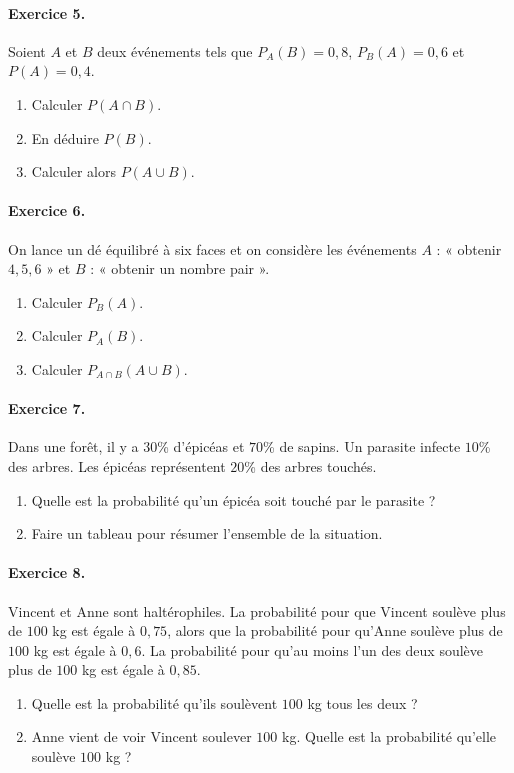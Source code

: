 \documentclass[11pt]{article}
\begin{document}
\paragraph{Exercice 5.} Soient $A$ et $B$ deux événements tels que $P_A(B)=0,8$,
$P_B(A)=0,6$ et $P(A)=0,4$.
\begin{enumerate}
  \item Calculer $P(A\cap B)$.
  \item En déduire $P(B)$.
  \item Calculer alors $P(A\cup B)$.
\end{enumerate}

\paragraph{Exercice 6.} On lance un dé équilibré à six faces et on considère les
événements $A$ : « obtenir $4, 5, 6$ » et $B$ : « obtenir un nombre pair ».
\begin{enumerate}
  \item Calculer $P_{B}(A)$.
  \item Calculer $P_A(B)$.
  \item Calculer $P_{A\cap B}(A\cup B)$.
\end{enumerate}

\paragraph{Exercice 7.}
Dans une forêt, il y a $30$\% d'épicéas et $70$\% de sapins. Un parasite infecte
$10$\% des arbres. Les épicéas représentent $20$\% des arbres touchés.
\begin{enumerate}
  \item Quelle est la probabilité qu'un épicéa soit touché par le parasite ?
  \item Faire un tableau pour résumer l'ensemble de la situation.
\end{enumerate}

\paragraph{Exercice 8.}
Vincent et Anne sont haltérophiles. La probabilité pour que Vincent soulève plus
de $100$ kg est égale à $0,75$, alors que la probabilité pour qu'Anne soulève
plus de $100$ kg est égale à $0,6$. La probabilité pour qu'au moins l'un des
deux soulève plus de $100$ kg est égale à $0,85$.
\begin{enumerate}
  \item Quelle est la probabilité qu'ils soulèvent $100$ kg tous les deux ?
  \item Anne vient de voir Vincent soulever $100$ kg. Quelle est la probabilité
    qu'elle soulève $100$ kg ?
\end{enumerate}
\end{document}
